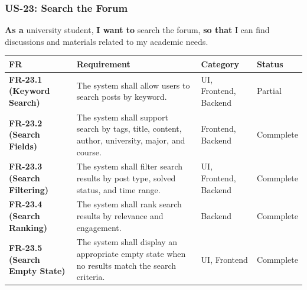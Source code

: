 \documentclass[12pt]{article}
\renewcommand{\baselinestretch}{1.5}
\begin{document}
\hypertarget{sec:us-23-search-the-forum}{}
\subsubsection*{US-23: Search the Forum}
\par\medskip

\textbf{As a} university student, \textbf{I want to} search the forum, \textbf{so that} I can find discussions and materials related to my academic needs.
\par\medskip

\begingroup
\small
\renewcommand{\baselinestretch}{1.0}\selectfont
\renewcommand{\arraystretch}{1.15}
\setlength{\tabcolsep}{6pt}
\begin{longtable}{|>{\raggedright\arraybackslash}p{}|>{\raggedright\arraybackslash}p{}|>{\raggedright\arraybackslash}p{}|>{\raggedright\arraybackslash}p{}|}
\hline
\textbf{FR} & \textbf{Requirement} & \textbf{Category} & \textbf{Status} \\ \hline
\endhead
\textbf{FR-23.1 (Keyword Search)} & The system shall allow users to search posts by keyword. & UI, Frontend, Backend & Partial \\ \hline
\textbf{FR-23.2 (Search Fields)} & The system shall support search by tags, title, content, author, university, major, and course. & Frontend, Backend & Commplete \\ \hline
\textbf{FR-23.3 (Search Filtering)} & The system shall filter search results by post type, solved status, and time range. & UI, Frontend, Backend & Commplete \\ \hline
\textbf{FR-23.4 (Search Ranking)} & The system shall rank search results by relevance and engagement. & Backend & Commplete \\ \hline
\textbf{FR-23.5 (Search Empty State)} & The system shall display an appropriate empty state when no results match the search criteria. & UI, Frontend & Commplete \\ \hline
\end{longtable}
\endgroup
\par\medskip

\par\medskip
\hypertarget{sec:ui-prototype-specimens}{}
\end{document}

